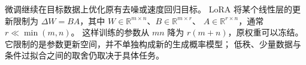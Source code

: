 微调继续在目标数据上优化原有去噪或速度回归目标。
LoRA 将某个线性层的更新限制为 $\Delta W=BA$，其中
$W\in\mathbb R^{m\times n}$、$B\in\mathbb R^{m\times r}$、
$A\in\mathbb R^{r\times n}$，通常 $r\ll\min(m,n)$。
这样训练的参数从 $mn$ 降为 $r(m+n)$，原权重可以冻结。
它限制的是参数更新空间，并不单独构成新的生成概率模型；
低秩、少量数据与条件过拟合之间的取舍仍取决于具体任务。
